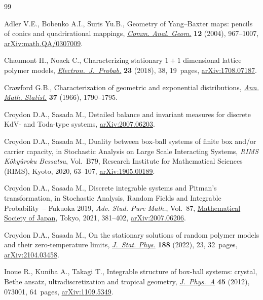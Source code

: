 \documentclass[pdftex]{sigma}
\numberwithin{equation}{section}
\begin{document}
\begin{thebibliography}{99}
\footnotesize\itemsep=0pt

Adler V.E., Bobenko A.I., Suris Yu.B., Geometry of {Y}ang--{B}axter maps:
 pencils of conics and quadrirational mappings,
 \href{https://doi.org/10.4310/cag.2004.v12.n5.a1}{\textit{Comm. Anal. Geom.}}
 \textbf{12} (2004), 967--1007,
 \href{http://arxiv.org/abs/math.QA/0307009}{arXiv:math.QA/0307009}.

Chaumont H., Noack C., Characterizing stationary {$1+1$} dimensional lattice
 polymer models,
 \href{https://doi.org/10.1214/18-EJP163}{\textit{Electron.~J.~Probab.}}
 \textbf{23} (2018), 38, 19~pages,
 \href{http://arxiv.org/abs/1708.07187}{arXiv:1708.07187}.

Crawford G.B., Characterization of geometric and exponential distributions,
 \href{https://doi.org/10.1214/aoms/1177699167}{\textit{Ann. Math. Statist.}}
 \textbf{37} (1966), 1790--1795.

Croydon D.A., Sasada M., Detailed balance and invariant measures for discrete
 {K}d{V}- and {T}oda-type systems,
 \href{http://arxiv.org/abs/2007.06203}{arXiv:2007.06203}.

Croydon D.A., Sasada M., Duality between box-ball systems of finite box and/or
 carrier capacity, in Stochastic Analysis on Large Scale Interacting Systems,
 \textit{RIMS K\^oky\^uroku Bessatsu}, Vol.~B79, Research Institute for
 Mathematical Sciences (RIMS), Kyoto, 2020, 63--107,
 \href{http://arxiv.org/abs/1905.00189}{arXiv:1905.00189}.

Croydon D.A., Sasada M., Discrete integrable systems and {P}itman's
 transformation, in Stochastic Analysis, Random Fields and Integrable
 Probability~-- {F}ukuoka 2019, \textit{Adv. Stud. Pure Math.}, Vol.~87,
 \href{https://doi.org/10.2969/aspm/08710381}{Mathematical Society of Japan},
 Tokyo, 2021, 381--402,
 \href{http://arxiv.org/abs/2007.06206}{arXiv:2007.06206}.

Croydon D.A., Sasada M., On the stationary solutions of random polymer models
 and their zero-temperature limits,
 \href{https://doi.org/10.1007/s10955-022-02947-x}{\textit{J.~Stat. Phys.}}
 \textbf{188} (2022), 23, 32~pages,
 \href{http://arxiv.org/abs/2104.03458}{arXiv:2104.03458}.

Inoue R., Kuniba A., Takagi T., Integrable structure of box-ball systems:
 crystal, {B}ethe ansatz, ultradiscretization and tropical geometry,
 \href{https://doi.org/10.1088/1751-8113/45/7/073001}{\textit{J.~Phys.~A}}
 \textbf{45} (2012), 073001, 64~pages,
 \href{http://arxiv.org/abs/1109.5349}{arXiv:1109.5349}.


\end{thebibliography}
\end{document}
